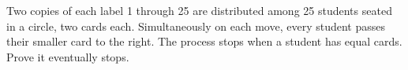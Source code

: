 Two copies of each label 1 through 25 are distributed among 25 students seated in a circle, two cards each. Simultaneously on each move, every student passes their smaller card to the right. The process stops when a student has equal cards. Prove it eventually stops.
